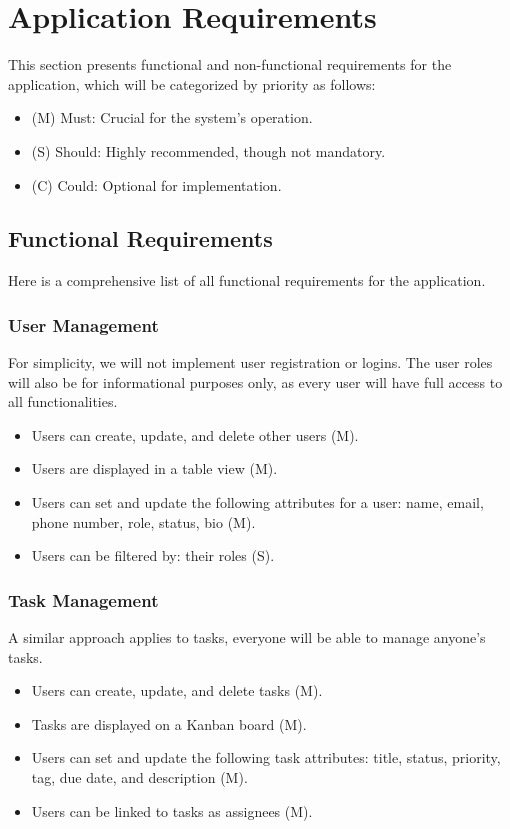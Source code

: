 \section{Application Requirements}
This section presents functional and non-functional requirements for the application, which will be categorized by priority as follows:
\begin{itemize}
   \item (M) Must: Crucial for the system's operation.
   \item (S) Should: Highly recommended, though not mandatory.
   \item (C) Could: Optional for implementation.
\end{itemize}

\subsection{Functional Requirements}
Here is a comprehensive list of all functional requirements for the application.
\subsubsection*{User Management}
For simplicity, we will not implement user registration or logins. The user roles will also be for informational purposes only, as every user will have full access to all functionalities.
\begin{itemize}
   \item Users can create, update, and delete other users (M).
   \item Users are displayed in a table view (M).
   \item Users can set and update the following attributes for a user: name, email, phone number, role, status, bio (M).
   \item Users can be filtered by: their roles (S).
\end{itemize}

\subsubsection*{Task Management}
A similar approach applies to tasks, everyone will be able to manage anyone's tasks.
\begin{itemize}
   \item Users can create, update, and delete tasks (M).
   \item Tasks are displayed on a Kanban board (M). 
   \item Users can set and update the following task attributes: title, status, priority, tag, due date, and description (M).
   \item Users can be linked to tasks as assignees (M).
\end{itemize}

